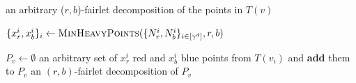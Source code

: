 \begin{algorithm}[!h]
\caption{: returns an ($r,b$)-fairlet decomposition of the points in $T(v)$}
\label{alg:recursive-fairlet-decomposition}
\begin{algorithmic}[1]
	
		\RETURN an arbitrary ($r,b$)-fairlet decomposition of the points in $T(v)$ 
	\ENDIF

	\item[]
	\STATE $\set{x^i_r, x^i_b}_{i} \leftarrow \Call{\minHeavy}{\set{N_r^i, N_b^i}_{i\in [\gamma^d]}, r, b}$ 
	
	\item[]
	\STATE $P_v \leftarrow \emptyset$
		 an arbitrary set of $x^i_r$ red and $x^i_b$ blue points from $T(v_i)$ and {\bf add} them to $P_v$ 
	\ENDFOR
	 an $(r,b)$-fairlet decomposition of $P_v$
	
	\item[]
		\STATE {} 
	\ENDFOR
\end{algorithmic}
\end{algorithm}


